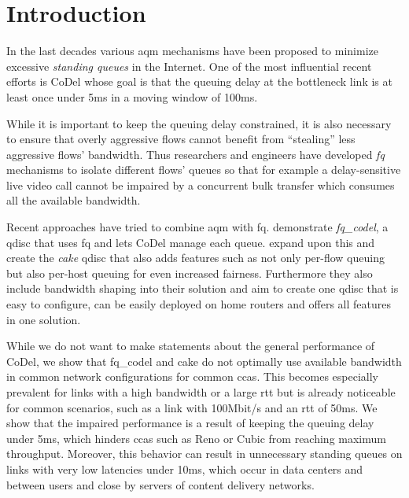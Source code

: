 \documentclass[10pt,sigconf,letterpaper,dvipsnames\ifx\removeHeaders\tempYes ,nonacm\fi]{acmart}
\newcommand{\codel}{CoDel}
\begin{document}
\maketitle

\section{Introduction}

In the last decades various \gls{aqm} mechanisms have been proposed to minimize excessive \textit{standing queues} in the Internet. One of the most influential recent efforts is \codel{} \cite{nichols_controlling_2012} whose goal is that the queuing delay at the bottleneck link is at least once under 5\;ms in a moving window of 100\;ms. 

While it is important to keep the queuing delay constrained, it is also necessary to ensure that overly aggressive flows cannot benefit from ``stealing'' less aggressive flows' bandwidth. Thus researchers and engineers have developed \textit{\gls{fq}} mechanisms \cite{shreedhar_efficient_1996,dumazet_pkt_sched:_2013} to isolate different flows' queues so that for example a delay-sensitive live video call cannot be impaired by a concurrent bulk transfer which consumes all the available bandwidth. 

Recent approaches have tried to combine \gls{aqm} with \gls{fq}. \cite{taht_flow_2018} demonstrate \textit{fq\_codel}, a \gls{qdisc} that uses \gls{fq} and lets \codel{} manage each queue. \cite{hoiland-jorgensen_piece_2018} expand upon this and create the \textit{cake} \gls{qdisc} that also adds features such as not only per-flow queuing but also per-host queuing for even increased fairness. Furthermore they also include bandwidth shaping into their solution and aim to create one \gls{qdisc} that is easy to configure, can be easily deployed on home routers and offers all features in one solution. 

While we do not want to make statements about the general performance of \codel{}, we show that fq\_codel and cake do not optimally use available bandwidth in common network configurations for common \glspl{cca}. This becomes especially prevalent for links with a high bandwidth or a large \gls{rtt} but is already noticeable for common scenarios, such as a link with 100\;Mbit/s and an \gls{rtt} of 50\;ms. We show that the impaired performance is a result of keeping the queuing delay under 5\;ms, which hinders \glspl{cca} such as Reno or Cubic from reaching maximum throughput. Moreover, this behavior can result in unnecessary standing queues on links with very low latencies under 10\;ms, which occur in data centers and between users and close by servers of content delivery networks. 
\end{document}
